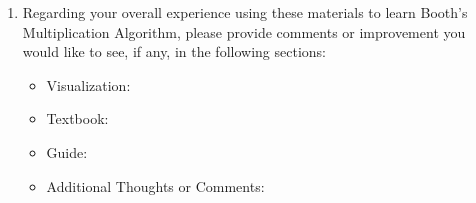 \documentclass{article}
\begin{document}
\begin{enumerate}
\item Regarding your overall experience using these materials to learn Booth's Multiplication Algorithm, please provide comments or improvement you would like to see, if any, in the following sections:
\begin{itemize}
\item Visualization:
\vspace{1cm}
\item Textbook:
\vspace{1cm}
\item Guide:
\vspace{1cm}
\item Additional Thoughts or Comments:

\end{itemize}

\end{enumerate}
\end{document}
